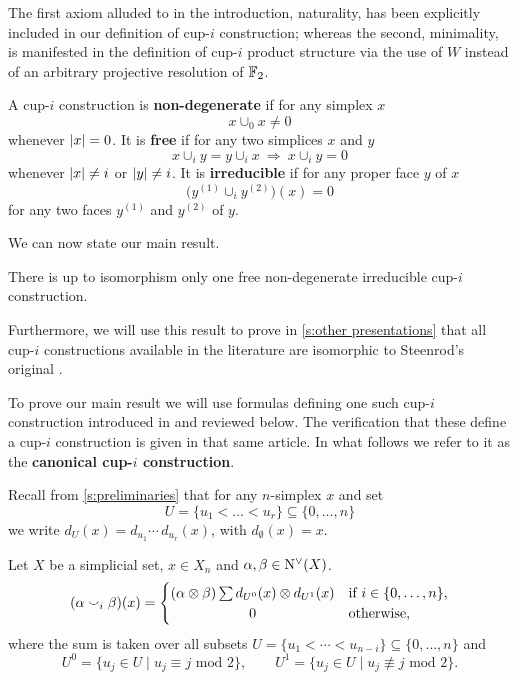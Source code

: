 The first axiom alluded to in the introduction, naturality, has been explicitly included in our definition of cup-$i$ construction; whereas the second, minimality, is manifested in the definition of cup-$i$ product structure via the use of $W$ instead of an arbitrary projective resolution of ${\mathbb{F}_2}$.
\begin{definition}
	A cup-$i$ construction is \textbf{non-degenerate} if for any simplex $x$
	\[
	\boxed{x \cup_0 x \neq 0}
	\]
	whenever $\lvert x\rvert = 0$.
	It is \textbf{free} if for any two simplices $x$ and $y$
	\[
	\boxed{x \cup_{i} y = y \cup_{i} x} \
	\Longrightarrow \
	\boxed{x \cup_{i} y = 0}
	\]
	whenever $\lvert x\rvert \neq i$ or $\lvert y\rvert \neq i$.
	It is \textbf{irreducible} if for any proper face $y$ of $x$
	\[
	\boxed{\Big( y^{(1)} \cup_{i} y^{(2)} \Big)(x) = 0}
	\]
	for any two faces $y^{(1)}$ and $y^{(2)}$ of $y$.
\end{definition}

We can now state our main result.

\begin{theorem} \label{t:main}
	There is up to isomorphism only one free non-degenerate irreducible cup-$i$ construction.
\end{theorem}

Furthermore, we will use this result to prove in \cref{s:other presentations} that all cup-$i$ constructions available in the literature are isomorphic to Steenrod's original \cite{steenrod1947products}.

To prove our main result we will use formulas defining one such cup-$i$ construction introduced in \cite{medina2021newformulas} and reviewed below.
The verification that these define a cup-$i$ construction is given in that same article.
In what follows we refer to it as the \textbf{canonical cup-$i$ construction}.

Recall from \cref{s:preliminaries} that for any $n$-simplex $x$ and set
\begin{equation*}
U = \{u_1 < \dots < u_r\} \subseteq \big\{ 0, \dots, n \big\}
\end{equation*}
we write $d_U(x) = d_{u_1}\! \dotsm \, d_{u_r}(x)$, with $d_{\emptyset}(x) = x$.

\begin{definition}[\cite{medina2021newformulas}] \label{d:my cup-i construction}
	Let $X$ be a simplicial set, $x \in X_n$ and $\alpha, \beta \in \operatorname{N^{\vee}}(X)$.
	\begin{equation} \label{e:new formulas}
	(\alpha \cup_i \beta)(x) =
	\begin{cases}
	(\alpha \ot \beta) \sum d_{U^0}(x) \ot d_{U^1}(x) &
	\text{if } i \in \{0, \dots, n\}, \\
	\hfil 0 &
	\text{otherwise},
	\end{cases}
	\end{equation}
	where the sum is taken over all subsets $U = \{u_1 < \cdots < u_{n-i}\} \subseteq \{0, \dots, n\}$ and
	\begin{equation} \label{e:partition subsets}
	U^0 = \{u_j \in U \mid u_j \equiv j \text{ mod } 2\}, \qquad
	U^1 = \{u_j \in U \mid u_j \not\equiv j \text{ mod } 2\}.
	\end{equation}
\end{definition}

